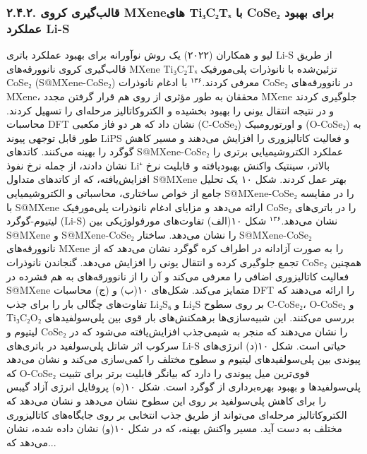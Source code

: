 \documentclass[12pt,a4paper,twocolumn]{article} %
\newcommand{\persian}[1]{\textfarsi{#1}}
\newcommand{\english}[1]{\textenglish{#1}}
\begin{document}
\subsubsection*{\persian{۲.۴.۲. قالب‌گیری کروی \english{MXene}های \english{Ti₃C₂Tₓ} با \english{CoSe₂} برای بهبود عملکرد \english{Li-S}}}
\persian{
لیو و همکاران (۲۰۲۲) یک روش نوآورانه برای بهبود عملکرد باتری \english{Li-S} از طریق قالب‌گیری کروی نانوورقه‌های \english{MXene} \english{Ti₃C₂Tₓ} تزئین‌شده با نانوذرات پلی‌مورفیک \english{CoSe₂} (\english{S@MXene-CoSe₂}) معرفی کردند.$^{۱۳۶}$ با ادغام نانوذرات \english{CoSe₂} در نانوورقه‌های \english{MXene}، محققان به طور مؤثری از روی هم قرار گرفتن مجدد \english{MXene} جلوگیری کردند و در نتیجه انتقال یونی را بهبود بخشیده و الکتروکاتالیز مرحله‌ای را تسهیل کردند. محاسبات \english{DFT} نشان داد که هر دو فاز مکعبی (\english{C-CoSe₂}) و اورتورومبیک (\english{O-CoSe₂}) به طور قابل توجهی پیوند \english{LiPS} و فعالیت کاتالیزوری را افزایش می‌دهند و مسیر کاهش گوگرد را بهینه می‌کنند. کاتدهای \english{S@MXene-CoSe₂} عملکرد الکتروشیمیایی برتری را نشان دادند، از جمله نرخ نفوذ \english{Li⁺} بالاتر، سینتیک واکنش بهبودیافته و قابلیت نرخ افزایش‌یافته، که از کاتدهای متداول \english{S@MXene} بهتر عمل کردند. شکل ۱۰ یک تحلیل جامع از خواص ساختاری، محاسباتی و الکتروشیمیایی \english{S@MXene-CoSe₂} را در مقایسه با \english{S@MXene} ارائه می‌دهد و مزایای ادغام نانوذرات پلی‌مورفیک \english{CoSe₂} را در باتری‌های لیتیوم-گوگرد (\english{Li-S}) نشان می‌دهد.$^{۱۳۶}$ شکل ۱۰(الف) تفاوت‌های مورفولوژیکی بین \english{S@MXene} و \english{S@MXene-CoSe₂} را نشان می‌دهد. ساختار \english{S@MXene-CoSe₂} نانوورقه‌های \english{MXene} را به صورت آزادانه در اطراف کره گوگرد نشان می‌دهد که از تجمع جلوگیری کرده و انتقال یونی را افزایش می‌دهد. گنجاندن نانوذرات \english{CoSe₂} همچنین فعالیت کاتالیزوری اضافی را معرفی می‌کند و آن را از نانوورقه‌های به هم فشرده در \english{S@MXene} متمایز می‌کند. شکل‌های ۱۰(ب) و (ج) محاسبات \english{DFT} را ارائه می‌دهند که تفاوت‌های چگالی بار را برای جذب \english{Li₂S₆} و \english{Li₂S} بر روی سطوح \english{C-CoSe₂}، \english{O-CoSe₂} و \english{Ti₃C₂O₂} بررسی می‌کنند. این شبیه‌سازی‌ها برهمکنش‌های بار قوی بین پلی‌سولفیدهای لیتیوم و \english{CoSe₂} را نشان می‌دهند که منجر به شیمی‌جذب افزایش‌یافته می‌شود که در سرکوب اثر شاتل پلی‌سولفید در باتری‌های \english{Li-S} حیاتی است. شکل ۱۰(د) انرژی‌های پیوندی بین پلی‌سولفیدهای لیتیوم و سطوح مختلف را کمی‌سازی می‌کند و نشان می‌دهد که \english{O-CoSe₂} قوی‌ترین میل پیوندی را دارد که بیانگر قابلیت برتر برای تثبیت پلی‌سولفیدها و بهبود بهره‌برداری از گوگرد است. شکل ۱۰(ه) پروفایل انرژی آزاد گیبس را برای کاهش پلی‌سولفید بر روی این سطوح نشان می‌دهد و نشان می‌دهد که الکتروکاتالیز مرحله‌ای می‌تواند از طریق جذب انتخابی بر روی جایگاه‌های کاتالیزوری مختلف به دست آید. مسیر واکنش بهینه، که در شکل ۱۰(و) نشان داده شده، نشان می‌دهد که...
}
\end{document}
